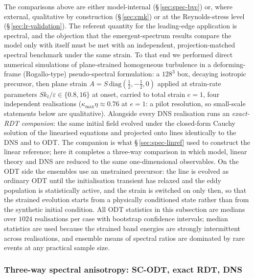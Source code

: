 \documentclass[lineno]{JFM-FLM_Au}
\begin{document}
The comparisons above are either model-internal
(\S\,\ref{sec:spec-bvc}) or, where external, qualitative by construction
(\S\,\ref{sec:cmk}) or at the Reynolds-stress level
(\S\,\ref{sec:lr-validation}). The referent quantity for the
leading-edge application is spectral, and the objection that the
emergent-spectrum results compare the model only with itself must be met
with an independent, projection-matched spectral benchmark under the
same strain. To that end
we performed direct numerical simulations of plane-strained homogeneous
turbulence in a deforming-frame (Rogallo-type) pseudo-spectral formulation:
a $128^3$ box, decaying isotropic precursor, then plane strain
$A=S\,\mathrm{diag}(\tfrac12,-\tfrac12,0)$ applied at strain-rate
parameters $Sk_t/\varepsilon\in\{0.8,16\}$ at onset, carried to total
strain $e=1$, four independent realisations
($\kappa_{\max}\eta\approx0.76$ at $e=1$: a pilot resolution, so
small-scale statements below are qualitative). Alongside every DNS
realisation runs an \emph{exact-RDT companion}: the same initial field
evolved under the closed-form Cauchy solution of the linearised equations
and projected onto lines identically to the DNS and to ODT. The companion
is what \S\,\ref{sec:spec-linref} used to construct the linear reference;
here it completes a three-way comparison in which model, linear theory and
DNS are reduced to the same one-dimensional observables. On the ODT side
the ensembles use an unstrained precursor: the line is evolved as ordinary
ODT until the initialisation transient has relaxed and the eddy population
is statistically active, and the strain is switched on only then, so that
the strained evolution starts from a physically conditioned state rather
than from the synthetic initial condition. All ODT statistics in this
subsection are medians over $1024$ realisations per case with bootstrap
confidence intervals; median statistics are used because the strained band
energies are strongly intermittent across realisations, and ensemble means
of spectral ratios are dominated by rare events at any practical sample
size.

\subsubsection{Three-way spectral anisotropy: SC-ODT, exact RDT,
DNS}\label{sec:threeway}
\end{document}
